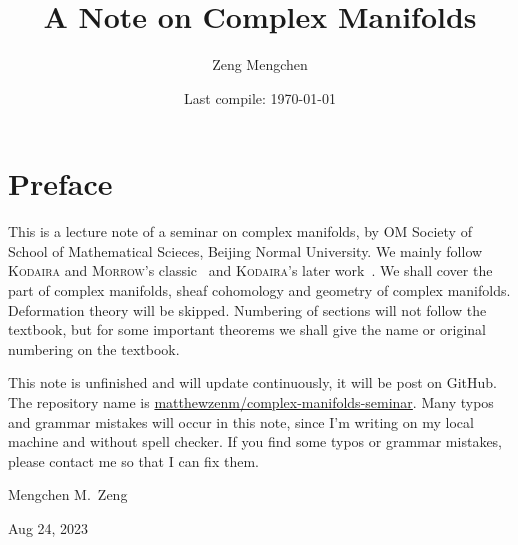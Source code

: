 \documentclass[a4paper]{book}
\title{A Note on Complex Manifolds}
\author{Zeng Mengchen}
\date{Last compile: \today}
\theoremstyle{definition}
\theoremstyle{plain}
\theoremstyle{remark}
\begin{document}
\maketitle
\thispagestyle{empty}

\frontmatter

\tableofcontents
\newpage
\thispagestyle{empty}

\chapter{Preface}

This is a lecture note of a seminar on complex manifolds, by OM Society of School of Mathematical Scieces, Beijing Normal University.
We mainly follow \textsc{Kodaira} and \textsc{Morrow}'s classic~\cite{Kodaira06} and \textsc{Kodaira}'s later work~\cite{Kodaira05}.
We shall cover the part of complex manifolds, sheaf cohomology and geometry of complex manifolds.
Deformation theory will be skipped.
Numbering of sections will not follow the textbook, but for some important theorems we shall give the name or original numbering on the textbook.

This note is unfinished and will update continuously, it will be post on GitHub.
The repository name is \href{https://github.com/matthewzenm/complex-manifolds-seminar}{matthewzenm/complex-manifolds-seminar}.
Many typos and grammar mistakes will occur in this note, since I'm writing on my local machine and without spell checker.
If you find some typos or grammar mistakes, please contact me so that I can fix them.

\begin{flushright}
    Mengchen M.\ Zeng

    Aug 24, 2023
\end{flushright}

\newpage
\thispagestyle{empty}

\mainmatter




\backmatter


\end{document}
